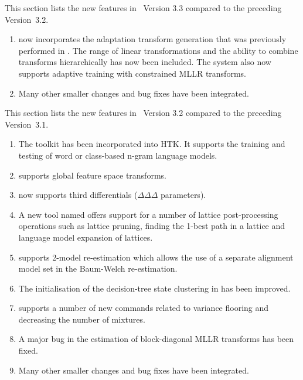 
This  section lists the new
features in \HTK\ Version 3.3 compared to the preceding Version~3.2.
\begin{enumerate}
\item {} now incorporates the adaptation transform
generation that was previously performed in .  The
range of linear transformations and the ability to combine transforms
hierarchically has now been included. The system also now supports 
adaptive training with constrained MLLR transforms.

\item Many other smaller changes and bug fixes have been integrated.
\end{enumerate}


This  section lists the new
features in \HTK\ Version 3.2 compared to the preceding Version~3.1.

\begin{enumerate}
\item The  toolkit has been incorporated into HTK. It
  supports the training and testing of word or class-based n-gram
  language models. 
\item {} supports global feature space transforms.
\item {} now supports third differentials
  ($\Delta\Delta\Delta$ parameters).
\item A new tool named  offers support for a number
  of lattice post-processing operations such as lattice pruning,
  finding the 1-best path in a lattice and language model expansion of
  lattices.
\item {} supports 2-model re-estimation which allows the
  use of a separate alignment model set in the Baum-Welch
  re-estimation.
\item The initialisation of the decision-tree state clustering in
   has been improved.
\item {} supports a number of new commands related to
  variance flooring and decreasing the number of mixtures.
\item A major bug in the estimation of block-diagonal MLLR transforms
  has been fixed.
\item Many other smaller changes and bug fixes have been integrated.
\end{enumerate}

